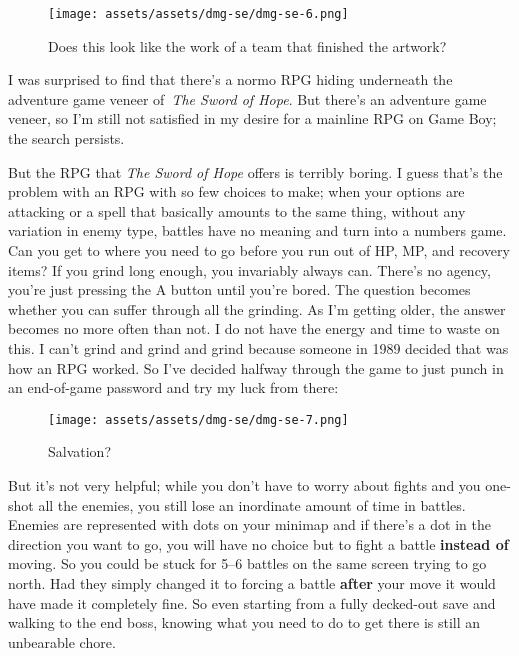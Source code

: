 \documentclass{book}
\begin{document}
\begin{figure}[hbt]
\vskip 10pt
\centering \texttt{[image: assets/assets/dmg-se/dmg-se-6.png]}\par\pagetwodescription Does this look like the work of a team that finished the artwork?
\vskip 6pt
\end{figure}
I was surprised to find that there’s a normo RPG hiding underneath the adventure game veneer of \emph{The Sword of Hope}. But there’s an adventure game veneer, so I’m still not satisfied in my desire for a mainline RPG on Game Boy; the search persists.

But the RPG that \emph{The Sword of Hope} offers is terribly boring. I guess that’s the problem with an RPG with so few choices to make; when your options are attacking or a spell that basically amounts to the same thing, without any variation in enemy type, battles have no meaning and turn into a numbers game. Can you get to where you need to go before you run out of HP, MP, and recovery items? If you grind long enough, you invariably always can. There’s no agency, you’re just pressing the A button until you’re bored. The question becomes whether you can suffer through all the grinding. As I’m getting older, the answer becomes no more often than not. I do not have the energy and time to waste on this. I can’t grind and grind and grind because someone in 1989 decided that was how an RPG worked. So I’ve decided halfway through the game to just punch in an end-of-game password and try my luck from there:

\begin{figure}[hbt]
\vskip 10pt
\centering \texttt{[image: assets/assets/dmg-se/dmg-se-7.png]}\par\pagetwodescription Salvation?
\vskip 6pt
\end{figure}

But it’s not very helpful; while you don’t have to worry about fights and you one-shot all the enemies, you still lose an inordinate amount of time in battles. Enemies are represented with dots on your minimap and if there’s a dot in the direction you want to go, you will have no choice but to fight a battle \textbf{instead of} moving. So you could be stuck for 5–6 battles on the same screen trying to go north. Had they simply changed it to forcing a battle \textbf{after} your move it would have made it completely fine. So even starting from a fully decked-out save and walking to the end boss, knowing what you need to do to get there is still an unbearable chore.
\end{document}
